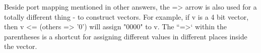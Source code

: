Beside port mapping mentioned in other answers, the => arrow is also used for a totally different thing - to construct vectors. For example, if v is a 4 bit vector, then v <= (others => '0') will assign "0000" to v. The ``=>` within the parentheses is a shortcut for assigning different values in different places inside the vector.\\




